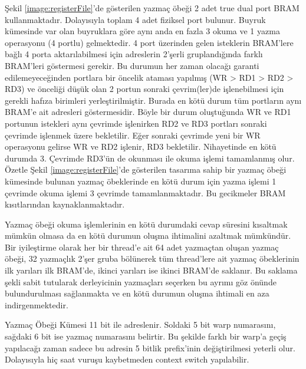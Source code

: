 Şekil \ref{image:registerFile}’de gösterilen yazmaç öbeği 2 adet true dual port BRAM kullanmaktadır. Dolayısıyla toplam 4 adet fiziksel port bulunur. Buyruk kümesinde var olan buyruklara göre aynı anda en fazla 3 okuma ve 1 yazma operasyonu (4 portlu) gelmektedir. 4 port üzerinden gelen isteklerin BRAM’lere bağlı 4 porta aktarılabilmesi için adreslerin 2’şerli gruplandığında farklı BRAM’leri göstermesi gerekir. Bu durumun her zaman olacağı garanti edilemeyeceğinden portlara bir öncelik ataması yapılmış (WR > RD1 > RD2 > RD3) ve önceliği düşük olan 2 portun sonraki çevrim(ler)de işlenebilmesi için gerekli hafıza birimleri yerleştirilmiştir. Burada en kötü durum tüm portların aynı BRAM’e ait adresleri göstermesidir.  Böyle bir durum oluştuğunda WR ve RD1 portunun istekleri aynı çevrimde işlenirken RD2 ve RD3 portları sonraki çevrimde işlenmek üzere bekletilir. Eğer sonraki çevrimde yeni bir WR operasyonu gelirse WR ve RD2 işlenir, RD3 bekletilir. Nihayetinde en kötü durumda 3. Çevrimde RD3’ün de okunması ile okuma işlemi tamamlanmış olur. Özetle Şekil \ref{image:registerFile}’de gösterilen tasarıma sahip bir yazmaç öbeği kümesinde bulunan yazmaç öbeklerinde en kötü durum için yazma işlemi 1 çevrimde okuma işlemi 3 çevrimde tamamlanmaktadır. Bu gecikmeler BRAM kısıtlarından kaynaklanmaktadır. \par
Yazmaç öbeği okuma işlemlerinin en kötü durumdaki cevap süresini kısaltmak mümkün olmasa da en kötü durumun oluşma ihtimalini azaltmak mümkündür. Bir iyileştirme olarak her bir thread’e ait 64 adet yazmaçtan oluşan yazmaç öbeği, 32 yazmaçlık 2’şer gruba bölünerek tüm thread’lere ait yazmaç öbeklerinin ilk yarıları ilk BRAM’de, ikinci yarıları ise ikinci BRAM’de saklanır. Bu saklama şekli sabit tutularak derleyicinin yazmaçları seçerken bu ayrımı göz önünde bulundurulması sağlanmakta ve en kötü durumun oluşma ihtimali en aza indirgenmektedir. \par
Yazmaç Öbeği Kümesi 11 bit ile adreslenir. Soldaki 5 bit warp numarasını, sağdaki 6 bit ise yazmaç numarasını belirtir. Bu şekilde farklı bir warp'a geçiş yapılacağı zaman sadece bu adresin 5 bitlik prefix’inin değiştirilmesi yeterli olur. Dolayısıyla hiç saat vuruşu kaybetmeden context switch yapılabilir.

